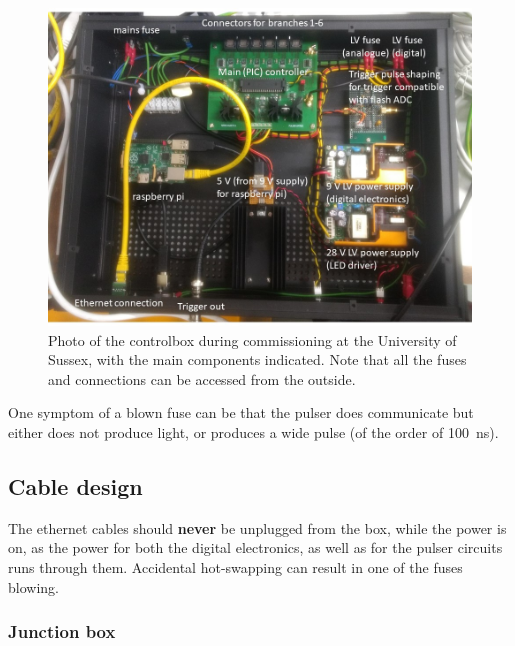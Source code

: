 \begin{figure}
\begin{center}	
  \includegraphics[width=0.75\linewidth]{figures/controlbox.jpg}
  \caption{Photo of the controlbox during commissioning at the University of Sussex, with the main components indicated. Note that all the fuses and connections can be accessed from the outside.}
  \label{figure:controlbox}
\end{center}
\end{figure}

One symptom of a blown fuse can be that  the pulser does communicate but either does not produce light, or produces a wide pulse (of the order of 100~ns).


\subsection*{Cable design}


The ethernet cables should {\bf never} be unplugged from the box, while the power is on, as the power for both the digital electronics, as well as for the pulser circuits runs through them. Accidental hot-swapping can result in one of the fuses blowing. 


\subsubsection*{Junction box}


